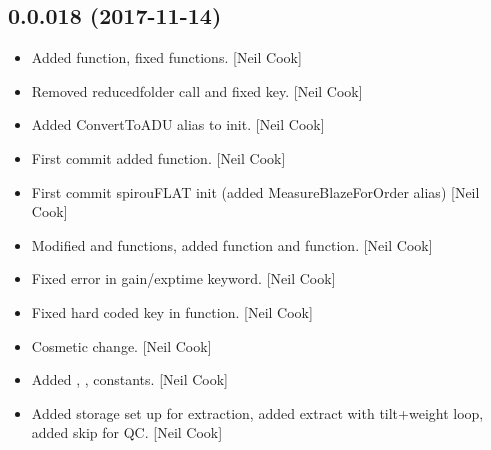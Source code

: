 \documentclass[a4paper,10pt,english]{report}
\begin{document}
\subsection{0.0.018 (2017-11-14)}
\label{\detokenize{misc/changelog:id533}}\begin{itemize}
\item {} 
Added  function, fixed 
functions. {[}Neil Cook{]}

\item {} 
Removed reducedfolder call and fixed  key. {[}Neil Cook{]}

\item {} 
Added ConvertToADU alias to init. {[}Neil Cook{]}

\item {} 
First commit  added  function.
{[}Neil Cook{]}

\item {} 
First commit spirouFLAT init (added MeasureBlazeForOrder alias) {[}Neil
Cook{]}

\item {} 
Modified  and  functions,
added  function and 
function. {[}Neil Cook{]}

\item {} 
Fixed error in gain/exptime keyword. {[}Neil Cook{]}

\item {} 
Fixed hard coded key in  function. {[}Neil Cook{]}

\item {} 
Cosmetic change. {[}Neil Cook{]}

\item {} 
Added , ,  constants. {[}Neil Cook{]}

\item {} 
Added storage set up for extraction, added extract with tilt+weight
loop, added skip for  QC. {[}Neil Cook{]}

\end{itemize}
\end{document}
